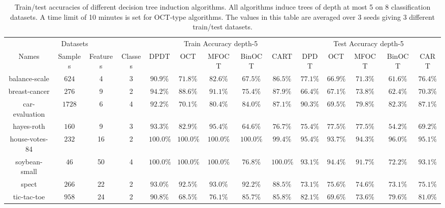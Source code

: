\begin{table}
    \centering
    \tiny
    \caption{Train/test accuracies of different decision tree induction algorithms. All algorithms induce trees of depth at most 5 on 8 classification datasets. A time limit of 10 minutes is set for OCT-type algorithms. The values in this table are averaged over 3 seeds giving 3 different train/test datasets. %
    }
    \begin{tabular}{|c|ccc|ccccc|ccccc|}
    \hline \multicolumn{4}{|c}{ Datasets } & \multicolumn{5}{|c|}{ Train Accuracy depth-5}& \multicolumn{5}{c|}{ Test Accuracy depth-5} \\
    Names & Samples & Features & Classes & DPDT & OCT & MFOCT & BinOCT & CART & DPDT & OCT & MFOCT & BinOCT & CART \\
    \hline 
    balance-scale & $624$ & 4 & 3 & $ 90.9 \%$ & $ 71.8 \%$ & $ 82.6 \%$ & $ 67.5 \%$ & $ 86.5 \%$ & $ 77.1 \%$ & $ 66.9 \%$ & $ 71.3 \%$ & $ 61.6 \%$ & $ 76.4 \%$  \\
    breast-cancer & $276$ & 9 & 2 & $ 94.2 \%$ & $ 88.6 \%$ & $ 91.1 \%$ & $ 75.4 \%$ & $ 87.9 \%$ & $ 66.4 \%$ & $ 67.1 \%$ & $ 73.8 \%$ & $ 62.4 \%$ & $ 70.3 \%$ \\
    car-evaluation & $1728$ & 6 & 4 & $ 92.2 \%$  & $ 70.1 \%$ & $ 80.4 \%$ & $ 84.0 \%$ & $ 87.1 \%$ & $ 90.3 \%$  &$ 69.5 \%$ & $ 79.8 \%$ & $ 82.3 \%$ & $ 87.1 \%$ \\
    hayes-roth & $160$ & 9 & 3 & $ 93.3 \%$  & $ 82.9 \%$ & $ 95.4 \%$ & $ 64.6 \%$ & $ 76.7 \%$ & $ 75.4 \%$ &$ 77.5 \%$ & $ 77.5 \%$ & $ 54.2 \%$ & $ 69.2 \%$ \\
    house-votes-84 & $232$ & 16 & 2 & $ 100.0 \%$ & $ 100.0 \%$ & $ 100.0 \%$ & $ 100.0 \%$ & $ 99.4 \%$ & $ 95.4 \%$ &$ 93.7 \%$ & $ 94.3 \%$ & $ 96.0 \%$ & $ 95.1 \%$\\
    soybean-small & $46$ & 50 & 4 & $ 100.0 \%$  & $ 100.0 \%$ & $ 100.0 \%$ & $ 76.8 \%$ & $ 100.0 \%$ & $ 93.1 \%$ &$ 94.4 \%$ & $ 91.7 \%$ & $ 72.2 \%$ & $ 93.1 \%$ \\
    spect & $266$ & 22 & 2 & $ 93.0 \%$ & $ 92.5 \%$ & $ 93.0 \%$ & $ 92.2 \%$ & $ 88.5 \%$ & $ 73.1 \%$ &$ 75.6 \%$ & $ 74.6 \%$ & $ 73.1 \%$ & $ 75.1 \%$\\
    tic-tac-toe & $958$ & 24 & 2 & $ 90.8 \%$ & $ 68.5 \%$ & $ 76.1 \%$ & $ 85.7 \%$ & $ 85.8 \%$ & $ 82.1 \%$  &$ 69.6 \%$ & $ 73.6 \%$ & $ 79.6 \%$ & $ 81.0 \%$\\
    \hline
    \end{tabular}
    \label{tab:more-res}
\end{table}

